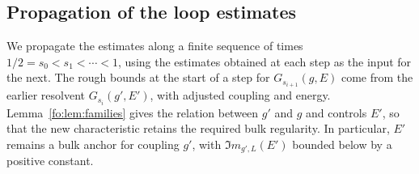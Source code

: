 \documentclass[11pt]{article}
\numberwithin{equation}{section}
\theoremstyle{remark}
\begin{document}
\subsection{Propagation of the loop estimates}
\label{sec:fo-inputs}\label{sec:fo-continuation}

We propagate the estimates along a finite sequence of times
$1/2=s_0<s_1<\cdots<1$, using the estimates obtained at each step
as the input for the next. The rough bounds at the start of a step for
$G_{s_{i+1}}(g,E)$ come from the earlier resolvent
$G_{s_i}(g',E')$, with adjusted coupling and energy.
Lemma~\ref{fo:lem:families} gives the relation between $g'$ and $g$
and controls $E'$, so that the new characteristic retains the required
bulk regularity. In particular, $E'$ remains a bulk anchor for coupling
$g'$, with $\Im m_{g',L}(E')$ bounded below by a positive constant.
\end{document}
